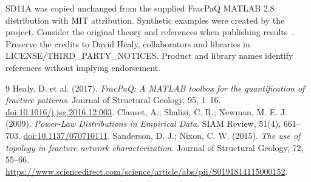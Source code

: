 SD11A was copied unchanged from the supplied FracPaQ MATLAB 2.8 distribution with MIT attribution. Synthetic examples were created by the project. Consider the original theory and references when publishing results~\cite{healy}. Preserve the credits to David Healy, collaborators and libraries in LICENSE/THIRD\_PARTY\_NOTICES. Product and library names identify references without implying endorsement.

\begin{thebibliography}{9}
 Healy, D. et al. (2017). \emph{FracPaQ: A MATLAB toolbox for the quantification of fracture patterns}. Journal of Structural Geology, 95, 1--16. \href{https://doi.org/10.1016/j.jsg.2016.12.003}{doi:10.1016/j.jsg.2016.12.003}.
 Clauset, A.; Shalizi, C. R.; Newman, M. E. J. (2009). \emph{Power-Law Distributions in Empirical Data}. SIAM Review, 51(4), 661--703. \href{https://doi.org/10.1137/070710111}{doi:10.1137/070710111}.
 Sanderson, D. J.; Nixon, C. W. (2015). \emph{The use of topology in fracture network characterization}. Journal of Structural Geology, 72, 55--66. \url{https://www.sciencedirect.com/science/article/abs/pii/S0191814115000152}.
\end{thebibliography}
